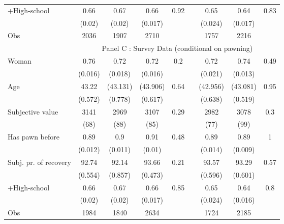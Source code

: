 \begin{tabular}{lcccccccc}
+High-school & 0.66  & 0.67  & 0.66  & 0.92  &       & 0.65  & 0.64  & 0.83 \\
      & (0.02) & (0.02) & (0.017) &       &       & (0.024) & (0.017) &  \\
\midrule
Obs   & 2036  & 1907  & 2710  &       &       & 1757  & 2216  &  \\
\midrule
      & \multicolumn{8}{c}{Panel C : Survey Data (conditional on pawning)} \\
\midrule
\midrule
Woman & 0.76  & 0.72  & 0.72  & 0.2   &       & 0.72  & 0.74  & 0.49 \\
      & (0.016) & (0.018) & (0.016) &       &       & (0.021) & (0.013) &  \\
Age   & 43.22 & (43.131) & (43.906) & 0.64  &       & (42.956) & (43.081) & 0.95 \\
      & (0.572) & (0.778) & (0.617) &       &       & (0.638) & (0.519) &  \\
Subjective value & 3141  & 2969  & 3107  & 0.29  &       & 2982  & 3078  & 0.3 \\
      & (68)  & (88)  & (85)  &       &       & (77)  & (99)  &  \\
Has pawn before & 0.89  & 0.9   & 0.91  & 0.48  &       & 0.89  & 0.89  & 1 \\
      & (0.012) & (0.011) & (0.01) &       &       & (0.014) & (0.009) &  \\
Subj. pr. of recovery & 92.74 & 92.14 & 93.66 & 0.21  &       & 93.57 & 93.29 & 0.57 \\
      & (0.554) & (0.857) & (0.473) &       &       & (0.596) & (0.601) &  \\
+High-school & 0.66  & 0.67  & 0.66  & 0.85  &       & 0.65  & 0.64  & 0.8 \\
      & (0.02) & (0.02) & (0.017) &       &       & (0.024) & (0.016) &  \\
\midrule
Obs   & 1984  & 1840  & 2634  &       &       & 1724  & 2185  &  \\
\bottomrule
\bottomrule
\end{tabular}%
